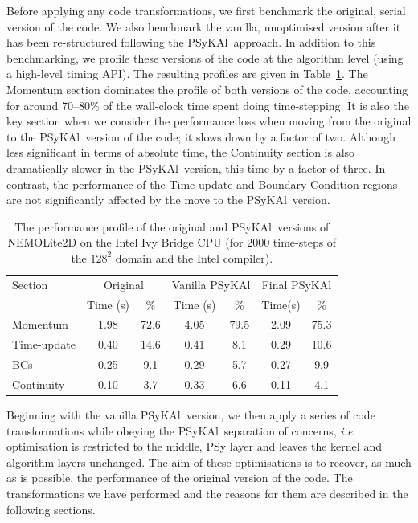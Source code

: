 \documentclass[journal]{IEEEtran}
\newcommand{\psykal}{{PS}y{KA}l}
\begin{document}
Before applying any code transformations, we first benchmark the
original, serial version of the code. We also benchmark the vanilla,
unoptimised version after it has been re-structured following the
\psykal\ approach. In addition to this benchmarking, we profile these
versions of the code at the algorithm level (using a high-level timing
API). The resulting profiles are given in
Table~\ref{TABLE_profile}. The Momentum section dominates the profile
of both versions of the code, accounting for around 70--80\% of the
wall-clock time spent doing time-stepping. It is also the key section
when we consider the performance loss when moving from the original to
the \psykal\ version of the code; it slows down by a factor of
two. Although less significant in terms of absolute time, the
Continuity section is also dramatically slower in the \psykal\ version,
this time by a factor of three. In contrast, the performance of the
Time-update and Boundary Condition regions are not significantly
affected by the move to the \psykal\ version.

\begin{table}[!t]
\caption{The performance profile of the original and \psykal\ versions
  of NEMOLite2D on the Intel Ivy Bridge CPU (for 2000 time-steps of the
  $128^{2}$ domain and the Intel compiler).}
\label{TABLE_profile}
\centering
\begin{tabular}{l|c|c|c|c|c|c}
\hline
Section & \multicolumn{2}{c|}{Original} & \multicolumn{2}{c|}{Vanilla \psykal} &
\multicolumn{2}{c}{Final \psykal} \\
        & Time (s) & \%  & Time (s) & \%  & Time(s) & \% \\
\hline
Momentum    & 1.98  & 72.6  & 4.05  & 79.5 & 2.09 & 75.3 \\
Time-update & 0.40  & 14.6  & 0.41  & 8.1  & 0.29 & 10.6 \\
BCs         & 0.25  & 9.1   & 0.29  & 5.7  & 0.27 & 9.9  \\
Continuity  & 0.10  & 3.7   & 0.33  & 6.6  & 0.11 & 4.1  \\
\hline
\end{tabular}
\end{table}

Beginning with the vanilla \psykal\ version, we then apply a series of
code transformations while obeying the \psykal\ separation of concerns,
{\it i.e.} optimisation is restricted to the middle, {PS}y layer and
leaves the kernel and algorithm layers unchanged. The aim of these
optimisations is to recover, as much as is possible, the performance
of the original version of the code. The transformations we have
performed and the reasons for them are described in the following sections.
\end{document}
